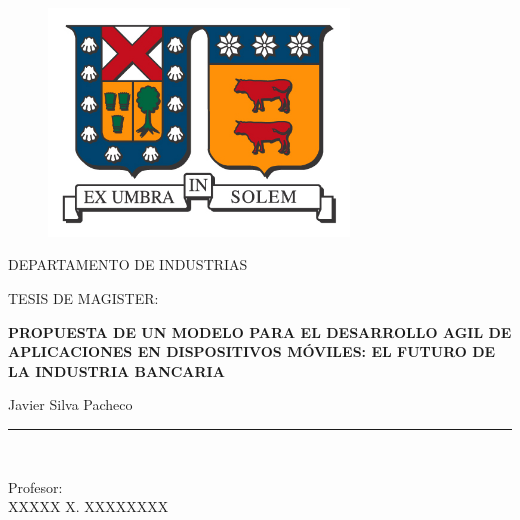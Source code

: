 \documentclass[a4paper,openright,12pt]{book}
\begin{document}
\thispagestyle{empty}

\begin{titlepage}

\begin{center}
\vspace*{-1in}
\begin{figure}[htb]
\begin{center}
\includegraphics[width=8cm]{./img/usm.jpg}
\end{center}
\end{figure}

DEPARTAMENTO DE INDUSTRIAS \\
\vspace*{0.6in}
\begin{large}
TESIS DE MAGISTER:\\
\end{large}
\vspace*{0.2in}
\begin{Large}
\textbf{PROPUESTA DE UN MODELO PARA EL DESARROLLO AGIL DE APLICACIONES EN DISPOSITIVOS MÓVILES: EL FUTURO DE LA INDUSTRIA BANCARIA} \\
\end{Large}
\vspace*{0.3in}
\begin{large}
Javier Silva Pacheco\\
\end{large}
\vspace*{0.3in}
\rule{80mm}{0.1mm}\\
\vspace*{0.1in}
\begin{large}
Profesor: \\
XXXXX X. XXXXXXXX \\
\end{large}
\end{center}

\end{titlepage}
\end{document}
